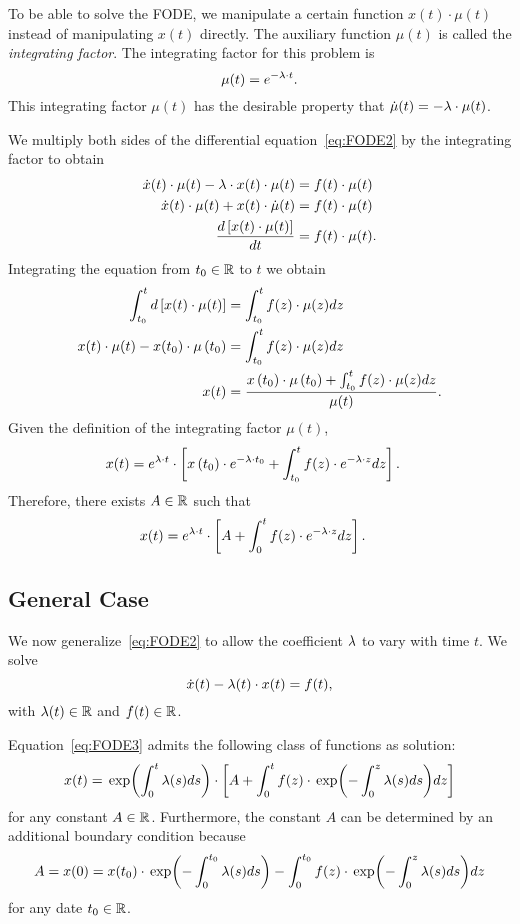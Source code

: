 \documentclass[letterpaper,12pt,leqno]{article}
\begin{document}
To be able to solve the FODE, we manipulate a certain function $x(t)\cdot \mu(t)$ instead of manipulating $x(t)$ directly. The auxiliary function $\mu(t) $ is called the \textit{integrating factor}. The integrating factor for this problem is 
\[\mu(t) =e^{-\lambda \cdot t}.\]
This integrating factor $\mu(t)$ has the desirable property that $\dot{\mu}(t) =-\lambda \cdot \mu(t)$.

We multiply both sides of the differential equation~\eqref{eq:FODE2} by the integrating factor to obtain
\begin{align*}
\dot{x}(t) \cdot \mu(t) -\lambda \cdot x(t)\cdot  \mu(t) & =f(t) \cdot \mu(t)\\
\dot{x}(t) \cdot\mu(t) +x(t) \cdot\dot{\mu}(t) &=f(t)\cdot \mu(t)\\
\frac{d \left[ x(t) \cdot \mu(t) \right]}{d t}& =f(t) \cdot\mu(t).
\end{align*}
Integrating the equation from $t_{0}\in \mathbb{R}$ to $t$ we obtain
\begin{align}
\int_{t_{0}}^{t} d\left[ x(t) \cdot \mu(t) \right]&=\int_{t_{0}}^{t}f(z) \cdot \mu(z) dz\nonumber\\
x(t)\cdot \mu(t)-x(t_{0})\cdot \mu\left( t_{0} \right)&=\int_{t_{0}}^{t}f(z)\cdot  \mu(z) dz\nonumber\\
x(t)& =\frac{x\left( t_{0} \right) \cdot \mu\left( t_{0} \right)+\int_{t_{0}}^{t}f(z) \cdot \mu(z) dz}{\mu(t)}.\label{eq:INTER}
\end{align}
Given the definition of the integrating factor $\mu(t)$, 
\begin{align*}
x(t)& =e^{\lambda \cdot t} \cdot \left[ x\left( t_{0} \right) \cdot e^{-\lambda\cdot t_{0}}+\int_{t_{0}}^{t}f(z) \cdot e^{-\lambda \cdot z} dz \right].
\end{align*}
Therefore, there exists $A\in \mathbb{R}$ such that 
\begin{align*}
x(t)& =e^{\lambda \cdot t} \cdot \left[ A+\int_{0}^{t}f(z) \cdot e^{-\lambda \cdot z} dz \right] .
\end{align*}

\subsection{General Case}

We now generalize~\eqref{eq:FODE2} to allow the coefficient $\lambda$ to vary with time $t$. We solve
\begin{equation}
\dot{x}(t) -\lambda(t) \cdot x(t) =f(t),\label{eq:FODE3}
\end{equation}
with $\lambda(t)\in \mathbb{R}$ and  $f(t)\in \mathbb{R}$. 

Equation~\eqref{eq:FODE3} admits the following class of functions as solution:
\begin{equation}
x(t)=\exp{\int_{0}^{t}\l(s) ds} \cdot \bs{A+\int_{0}^{t}f(z) \cdot \exp{-\int_{0}^{z}\l(s)ds} dz} \label{eq:FODE3sol}
\end{equation}
for any constant $A\in \mathbb{R}$. Furthermore, the constant $A$ can be determined by an additional boundary condition because
\[A=x(0)=x(t_{0})\cdot \exp{-\int_{0}^{t_{0}}\l(s)ds}-\int_{0}^{t_{0}}f(z) \cdot \exp{-\int_{0}^{z}\l(s)ds} dz\]
for any date $t_{0}\in \mathbb{R}$.
\end{document}
